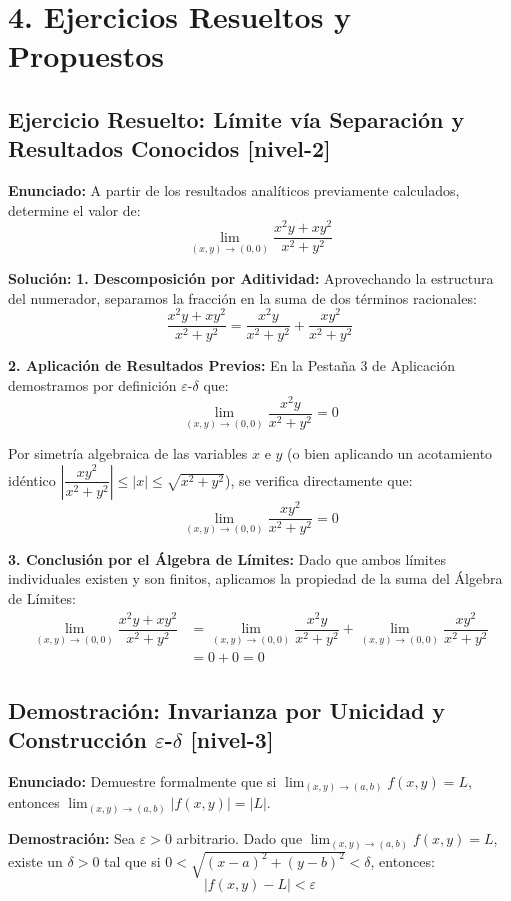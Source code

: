\documentclass[11pt]{article}
\newenvironment{ejercicios}{%
  \section*{4. Ejercicios Resueltos y Propuestos}%
}{}
\newenvironment{ejercicioresuelto}[2]{\subsection*{Ejercicio Resuelto: #1 \small{[#2]}}}{}
\newenvironment{ejerciciodemostracion}[2]{\subsection*{Demostración: #1 \small{[#2]}}}{}
\newcommand{\enunciado}[1]{\textbf{Enunciado:} #1\par\vspace{0.2cm}}
\newcommand{\solucion}[1]{\textbf{Solución:} #1\par\vspace{0.4cm}}
\newcommand{\demostracion}[1]{\textbf{Demostración:} #1\par\vspace{0.4cm}}
\begin{document}
\begin{ejercicios}

  \begin{ejercicioresuelto}{Límite vía Separación y Resultados Conocidos}{nivel-2}
    \enunciado{
      A partir de los resultados analíticos previamente calculados, determine el valor de:
      $$ \lim_{(x,y) \to (0,0)} \dfrac{x^2 y + x y^2}{x^2 + y^2} $$
    }
    \solucion{
      \textbf{1. Descomposición por Aditividad:}
      Aprovechando la estructura del numerador, separamos la fracción en la suma de dos términos racionales:
      $$ \dfrac{x^2 y + x y^2}{x^2 + y^2} = \dfrac{x^2 y}{x^2 + y^2} + \dfrac{x y^2}{x^2 + y^2} $$

      \textbf{2. Aplicación de Resultados Previos:}
      En la Pestaña 3 de Aplicación demostramos por definición $\varepsilon$-$\delta$ que:
      $$ \lim_{(x,y) \to (0,0)} \dfrac{x^2 y}{x^2 + y^2} = 0 $$

      Por simetría algebraica de las variables $x$ e $y$ (o bien aplicando un acotamiento idéntico $\left|\dfrac{x y^2}{x^2 + y^2}\right| \leq |x| \leq \sqrt{x^2+y^2}$), se verifica directamente que:
      $$ \lim_{(x,y) \to (0,0)} \dfrac{x y^2}{x^2 + y^2} = 0 $$

      \textbf{3. Conclusión por el Álgebra de Límites:}
      Dado que ambos límites individuales existen y son finitos, aplicamos la propiedad de la suma del Álgebra de Límites:
      \[\begin{aligned}
        \lim_{(x,y) \to (0,0)} \dfrac{x^2 y + x y^2}{x^2 + y^2} &= \lim_{(x,y) \to (0,0)} \dfrac{x^2 y}{x^2 + y^2} + \lim_{(x,y) \to (0,0)} \dfrac{x y^2}{x^2 + y^2} \\[0.5em]
        &= 0 + 0 = 0
      \end{aligned}\]
    }
  \end{ejercicioresuelto}

  \begin{ejerciciodemostracion}{Invarianza por Unicidad y Construcción $\varepsilon$-$\delta$}{nivel-3}
    \enunciado{
      Demuestre formalmente que si $\displaystyle \lim_{(x,y) \to (a,b)} f(x,y) = L$, entonces $\displaystyle \lim_{(x,y) \to (a,b)} |f(x,y)| = |L|$.
    }
    \demostracion{
      Sea $\varepsilon > 0$ arbitrario. Dado que $\displaystyle \lim_{(x,y) \to (a,b)} f(x,y) = L$, existe un $\delta > 0$ tal que si $0 < \sqrt{(x-a)^2 + (y-b)^2} < \delta$, entonces:
      $$ |f(x,y) - L| < \varepsilon $$

}
\end{ejerciciodemostracion}
\end{ejercicios}
\end{document}
